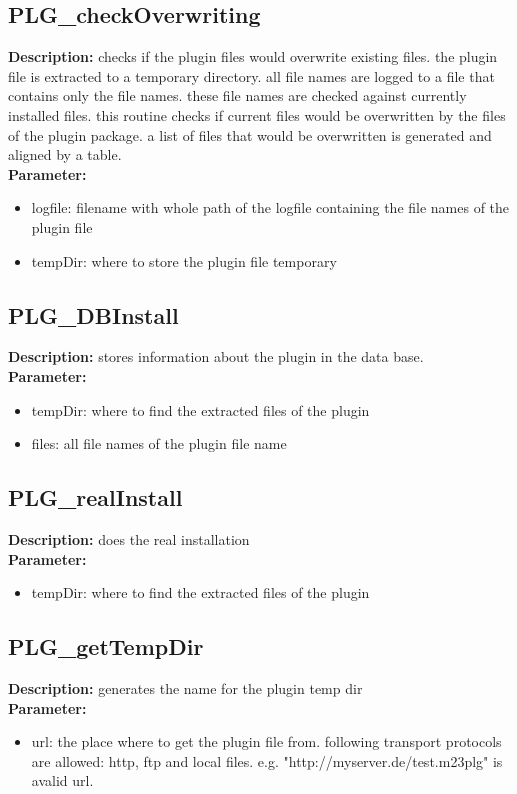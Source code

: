 \subsection{PLG\_checkOverwriting}
\textbf{Description:} checks if the plugin files would overwrite existing files. the plugin file is extracted to a temporary directory. all file names are logged to a file that contains only the file names. these file names are checked against currently installed files. this routine checks if current files would be overwritten by the files of the plugin package. a list of files that would be overwritten is generated and aligned by a table.\\
\textbf{Parameter:}
\begin{itemize}
\item logfile: filename with whole path of the logfile containing the file names of the plugin file
\item tempDir: where to store the plugin file temporary
\end{itemize}

\subsection{PLG\_DBInstall}
\textbf{Description:} stores information about the plugin in the data base.\\
\textbf{Parameter:}
\begin{itemize}
\item tempDir: where to find the extracted files of the plugin
\item files: all file names of the plugin file name
\end{itemize}

\subsection{PLG\_realInstall}
\textbf{Description:} does the real installation\\
\textbf{Parameter:}
\begin{itemize}
\item tempDir: where to find the extracted files of the plugin
\end{itemize}

\subsection{PLG\_getTempDir}
\textbf{Description:} generates the name for the plugin temp dir\\
\textbf{Parameter:}
\begin{itemize}
\item url: the place where to get the plugin file from. following transport protocols are allowed: http, ftp and local files. e.g. "http://myserver.de/test.m23plg" is avalid url.
\end{itemize}


